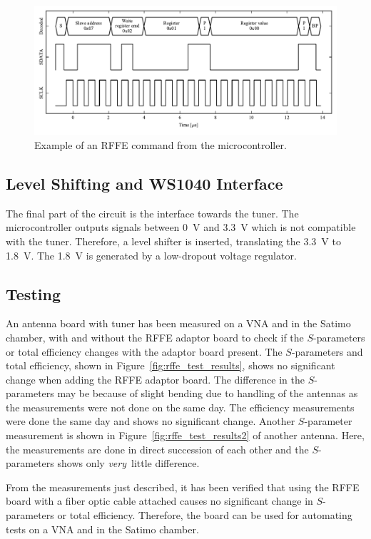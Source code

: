 \begin{figure}[htbp]
    \centering
    \includegraphics{img/optical_rffe/avr_rffe_reg1_0x00}
    \caption{Example of an RFFE command from the microcontroller.}
    \label{fig:rffe_example}
\end{figure}

\subsection{Level Shifting and WS1040 Interface}
The final part of the circuit is the interface towards the tuner. The microcontroller outputs signals between \SI{0}{V} and \SI{3.3}{V} which is not compatible with the tuner. Therefore, a level shifter is inserted, translating the \SI{3.3}{V} to \SI{1.8}{V}. The \SI{1.8}{V} is generated by a low-dropout voltage regulator.

\subsection{Testing}
An antenna board with tuner has been measured on a VNA and in the Satimo chamber, with and without the RFFE adaptor board to check if the $S$-parameters or total efficiency changes with the adaptor board present. The $S$-parameters and total efficiency, shown in Figure~\ref{fig:rffe_test_results}, shows no significant change when adding the RFFE adaptor board. The difference in the $S$-parameters may be because of slight bending due to handling of the antennas as the measurements were not done on the same day. The efficiency measurements were done the same day and shows no significant change. Another $S$-parameter measurement is shown in Figure~\ref{fig:rffe_test_results2} of another antenna. Here, the measurements are done in direct succession of each other and the $S$-parameters shows only \emph{very} little difference.

From the measurements just described, it has been verified that using the RFFE board with a fiber optic cable attached causes no significant change in $S$-parameters or total efficiency. Therefore, the board can be used for automating tests on a VNA and in the Satimo chamber.

